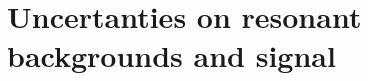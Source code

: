 \section{Uncertanties on resonant backgrounds and signal} \label{sec:systematics:resonant_modeling}
